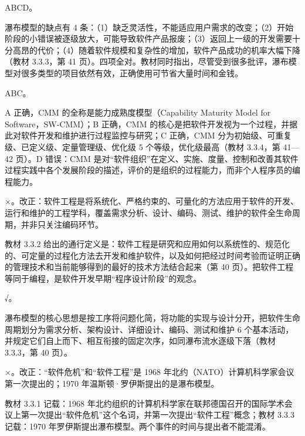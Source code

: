 \documentclass[a4paper,11pt]{article}
\begin{document}
\q ABCD。\begin{analysis}瀑布模型的缺点有 4 条：（1）缺乏灵活性，不能适应用户需求的改变；（2）开始阶段的小错误被逐级放大，可能导致软件产品报废；（3）返回上一级的开发需要十分高昂的代价；（4）随着软件规模和复杂性的增加，软件产品成功的机率大幅下降（教材 3.3.3，第 41 页）。四项全对。教材同时指出，尽管受到很多批评，瀑布模型对很多类型的项目依然有效，正确使用可节省大量时间和金钱。\end{analysis}

\q ABC。\begin{analysis}A 正确，CMM 的全称是能力成熟度模型（Capability Maturity Model for Software，SW-CMM）；B 正确，CMM 的核心是把软件开发视为一个过程，并据此对软件开发和维护进行过程监控与研究；C 正确，CMM 分为初始级、可重复级、已定义级、定量管理级、优化级 5 个等级，优化级最高（教材 3.3.4，第 41—42 页）。D 错误：CMM 是对“软件组织”在定义、实施、度量、控制和改善其软件过程实践中各个发展阶段的描述，评价的是组织的过程能力，而非个人程序员的编程能力。\end{analysis}


\q ×。改正：软件工程是将系统化、严格约束的、可量化的方法应用于软件的开发、运行和维护的工程学科，覆盖需求分析、设计、编码、测试、维护的软件全生命周期，并非只关注编码环节。\begin{analysis}教材 3.3.2 给出的通行定义是：软件工程是研究和应用如何以系统性的、规范化的、可定量的过程化方法去开发和维护软件，以及如何把经过时间考验而证明正确的管理技术和当前能够得到的最好的技术方法结合起来（第 40 页）。把软件工程等同于编程，是软件开发早期“程序设计阶段”的观念。\end{analysis}

\q √。\begin{analysis}瀑布模型的核心思想是按工序将问题化简，将功能的实现与设计分开，把软件生命周期划分为需求分析、架构设计、详细设计、编码、测试和维护 6 个基本活动，并规定它们自上而下、相互衔接的固定次序，如同瀑布流水逐级下落（教材 3.3.3，第 40 页）。\end{analysis}

\q ×。改正：“软件危机”和“软件工程”是 1968 年北约（NATO）计算机科学家会议第一次提出的；1970 年温斯顿·罗伊斯提出的是瀑布模型。\begin{analysis}教材 3.3.1 记载：1968 年北约组织的计算机科学家在联邦德国召开的国际学术会议上第一次提出“软件危机”这个名词，并第一次提出“软件工程”概念；教材 3.3.3 记载：1970 年罗伊斯提出瀑布模型。两个事件的时间与提出者不能混淆。\end{analysis}
\end{document}
